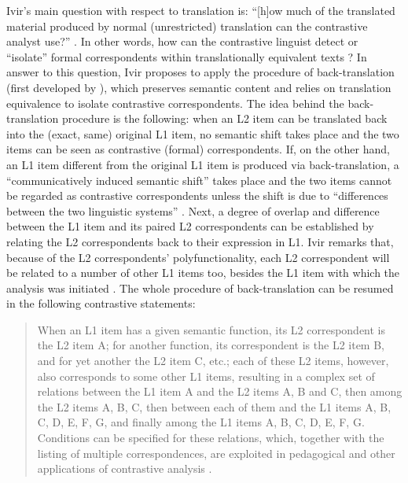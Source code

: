 Ivir’s main question with respect to translation is: “[h]ow much of the translated material produced by normal (unrestricted) translation can the contrastive analyst use?” \citep[16]{ivir_contrasting_1969}. In other words, how can the contrastive linguist detect or “isolate” formal correspondents within translationally equivalent texts \citep[175]{ivir_translation-based_1983}? In answer to this question, Ivir proposes to apply the procedure of back-translation (first developed by \citealt{spalatin_contrastive_1967}), which preserves semantic content \citep[477]{dirven_functionalism_1987} and relies on translation equivalence to isolate contrastive correspondents. The idea behind the back-translation procedure is the following: when an L2 item can be translated back into the (exact, same) original L1 item, no semantic shift takes place and the two items can be seen as contrastive (formal) correspondents. If, on the other hand, an L1 item different from the original L1 item is produced via back-translation, a “communicatively induced semantic shift” takes place and the two items cannot be regarded as contrastive correspondents \citep[477]{dirven_functionalism_1987} unless the shift is due to “differences between the two linguistic systems” \citep[176]{ivir_translation-based_1983}. Next, a degree of overlap and difference between the L1 item and its paired L2 correspondents can be established by relating the L2 correspondents back to their expression in L1. Ivir remarks that, because of the L2 correspondents’ polyfunctionality, each L2 correspondent will be related to a number of other L1 items too, besides the L1 item with which the analysis was initiated \citep[478]{dirven_functionalism_1987}. The whole procedure of back-translation can be resumed in the following contrastive statements:\largerpage[2]

\begin{quote}
When an L1 item has a given semantic function, its L2 correspondent is the L2 item A; for another function, its correspondent is the L2 item B, and for yet another the L2 item C, etc.; each of these L2 items, however, also corresponds to some other L1 items, resulting in a complex set of relations between the L1 item A and the L2 items A, B and C, then among the L2 items A, B, C, then between each of them and the L1 items A, B, C, D, E, F, G, and finally among the L1 items A, B, C, D, E, F, G. Conditions can be specified for these relations, which, together with the listing of multiple correspondences, are exploited in pedagogical and other applications of contrastive analysis \citep[478--479]{dirven_functionalism_1987}.
\end{quote}

